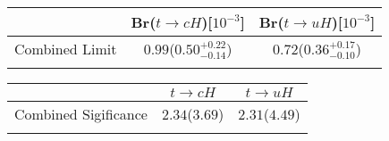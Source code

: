 \centering
\begin{tabular}{ccc} \toprule\toprule
 & Br($t\to cH$)[$10^{-3}$] & Br($t\to uH$)[$10^{-3}$]\\\midrule
Combined Limit & $0.99$($0.50^{+0.22}_{-0.14}$) & $0.72$($0.36^{+0.17}_{-0.10}$)\\
\bottomrule\bottomrule\\
\end{tabular}

\centering
\begin{tabular}{ccc} \toprule\toprule
 & $t\to cH$ & $t\to uH$\\\midrule
Combined Sigificance & $2.34$($3.69$) & $2.31$($4.49$)\\
\bottomrule\bottomrule\\
\end{tabular}
